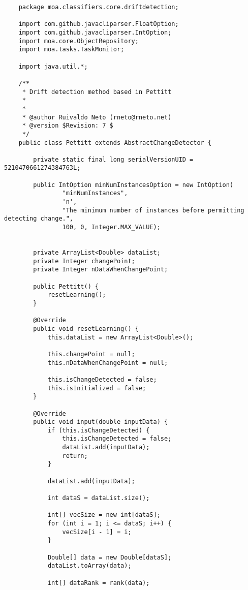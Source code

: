 \documentclass[qual, classic, a4paper]{ufbathesis}
\begin{document}
\begin{verbatim}
    package moa.classifiers.core.driftdetection;

    import com.github.javacliparser.FloatOption;
    import com.github.javacliparser.IntOption;
    import moa.core.ObjectRepository;
    import moa.tasks.TaskMonitor;
    
    import java.util.*;
    
    /**
     * Drift detection method based in Pettitt
     *
     *
     * @author Ruivaldo Neto (rneto@rneto.net)
     * @version $Revision: 7 $
     */
    public class Pettitt extends AbstractChangeDetector {
    
        private static final long serialVersionUID = 5210470661274384763L;
    
        public IntOption minNumInstancesOption = new IntOption(
                "minNumInstances",
                'n',
                "The minimum number of instances before permitting detecting change.",
                100, 0, Integer.MAX_VALUE);
    
    
        private ArrayList<Double> dataList;
        private Integer changePoint;
        private Integer nDataWhenChangePoint;
    
        public Pettitt() {
            resetLearning();
        }
    
        @Override
        public void resetLearning() {
            this.dataList = new ArrayList<Double>();
    
            this.changePoint = null;
            this.nDataWhenChangePoint = null;
    
            this.isChangeDetected = false;
            this.isInitialized = false;
        }
    
        @Override
        public void input(double inputData) {
            if (this.isChangeDetected) {
                this.isChangeDetected = false;
                dataList.add(inputData);
                return;
            }
    
            dataList.add(inputData);
    
            int dataS = dataList.size();
    
            int[] vecSize = new int[dataS];
            for (int i = 1; i <= dataS; i++) {
                vecSize[i - 1] = i;
            }
    
            Double[] data = new Double[dataS];
            dataList.toArray(data);
    
            int[] dataRank = rank(data);
    

\end{verbatim}
\end{document}

